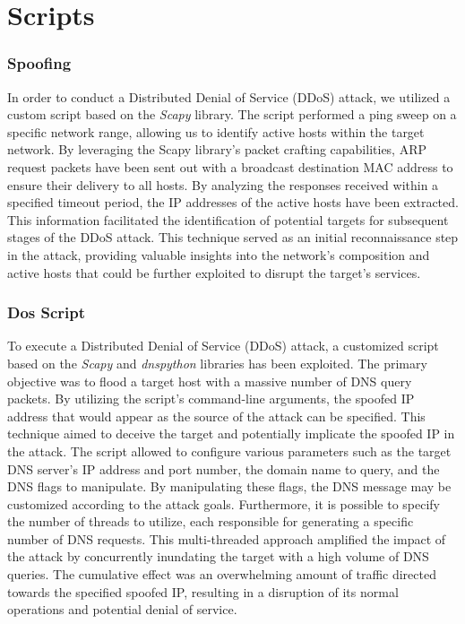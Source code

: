 \section{Scripts}

\subsubsection*{Spoofing}
In order to conduct a Distributed Denial of Service (DDoS) attack, we utilized a custom script based on the \textit{Scapy} library. The script performed a ping sweep on a 
specific network range, allowing us to identify active hosts within the target network. By leveraging the Scapy library's packet crafting capabilities,
ARP request packets have been sent out with a broadcast destination MAC address to ensure their delivery to all hosts. By analyzing the responses received 
within a specified timeout period, the IP addresses of the active hosts have been extracted. This information facilitated the identification of potential targets for 
subsequent stages of the DDoS attack. This technique served as an initial reconnaissance step in the attack, providing valuable insights into the 
network's composition and active hosts that could be further exploited to disrupt the target's services.

\subsubsection*{Dos Script}
To execute a Distributed Denial of Service (DDoS) attack, a customized script based on the \textit{Scapy} and \textit{dnspython} 
libraries has been exploited. The primary objective 
was to flood a target host with a massive number of DNS query packets. By utilizing the script's command-line arguments, the spoofed 
IP address that would appear as the source of the attack can be specified. This technique aimed to deceive the target and potentially implicate the spoofed IP in 
the attack. The script allowed to configure various parameters such as the target DNS server's IP address and port number, the domain name to 
query, and the DNS flags to manipulate. By manipulating these flags, the DNS message may be customized according to the attack goals. Furthermore, 
it is possible to specify the number of threads to utilize, each responsible for generating a specific number of DNS requests. This multi-threaded approach 
amplified the impact of the attack by concurrently inundating the target with a high volume of DNS queries. The cumulative effect was an overwhelming 
amount of traffic directed towards the specified spoofed IP, resulting in a disruption of its normal operations and potential denial of service.
